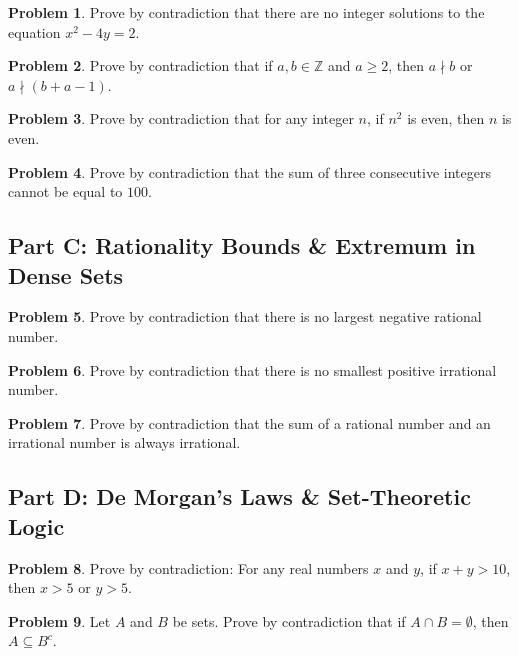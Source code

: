 \documentclass[11pt]{article}
\theoremstyle{definition}
\newtheorem{problem}{Problem}
\begin{document}
\begin{problem}
Prove by contradiction that there are no integer solutions to the equation $x^2 - 4y = 2$.
\end{problem}

\begin{problem}
Prove by contradiction that if $a, b \in \mathbb{Z}$ and $a \ge 2$, then $a \nmid b$ or $a \nmid (b + a - 1)$.
\end{problem}

\begin{problem}
Prove by contradiction that for any integer $n$, if $n^2$ is even, then $n$ is even.
\end{problem}

\begin{problem}
Prove by contradiction that the sum of three consecutive integers cannot be equal to $100$.
\end{problem}

\subsection{Part C: Rationality Bounds \& Extremum in Dense Sets}

\begin{problem}
Prove by contradiction that there is no largest negative rational number.
\end{problem}

\begin{problem}
Prove by contradiction that there is no smallest positive irrational number.
\end{problem}

\begin{problem}
Prove by contradiction that the sum of a rational number and an irrational number is always irrational.
\end{problem}

\subsection{Part D: De Morgan's Laws \& Set-Theoretic Logic}

\begin{problem}
Prove by contradiction: For any real numbers $x$ and $y$, if $x + y > 10$, then $x > 5$ or $y > 5$.
\end{problem}

\begin{problem}
Let $A$ and $B$ be sets. Prove by contradiction that if $A \cap B = \emptyset$, then $A \subseteq B^c$.
\end{problem}
\end{document}
